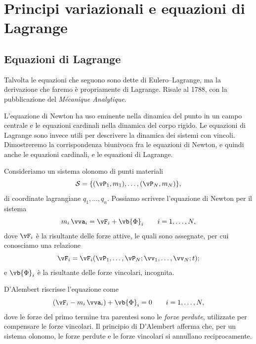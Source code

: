 \section{Principi variazionali e equazioni di Lagrange}
\subsection{Equazioni di Lagrange}
Talvolta le equazioni che seguono sono dette di Eulero--Lagrange, ma la derivazione che faremo è propriamente di Lagrange. Risale al 1788, con la pubblicazione del \emph{Mécanique Analytique}.

 L'equazione di Newton ha uso eminente nella dinamica del punto in un campo centrale e le equazioni cardinali nella dinamica del corpo rigido. Le equazioni di Lagrange sono invece utili per descrivere la dinamica dei sistemi con vincoli. Dimostreremo la corrispondenza biunivoca fra le equazioni di Newton, e quindi anche le equazioni cardinali, e le equazioni di Lagrange.

Consideriamo un sistema olonomo di punti materiali
\begin{equation*}
    \mathcal{S} = \{(\vP_1, m_1), \dots, (\vP_N, m_N)\},
\end{equation*}
di coordinate lagrangiane $q_1, \dots, q_n$.
Possiamo scrivere l'equazione di Newton per il sistema
\begin{equation*}
    m_i\,\vva_i = \vF_i + \vb{\Phi}_i \qquad i = 1, \dots, N,
\end{equation*}
dove $\vF_i$ è la risultante delle forze attive, le quali sono assegnate, per cui conosciamo una relazione
\begin{equation*}
    \vF_i = \vF_i(\vP_1, \dots, \vP_N; \vv_1, \dots, \vv_N; t);
\end{equation*}
e $\vb{\Phi}_i$ è la risultante delle forze vincolari, incognita.

D'Alembert riscrisse l'equazione come
\begin{equation}
    \label{eq:dalambert}
    (\vF_i -m_i\,\vva_i) + \vb{\Phi}_i = 0 \qquad i = 1, \dots, N,
\end{equation}
dove le forze del primo termine tra parentesi sono le \emph{forze perdute}, utilizzate per compensare le forze vincolari. Il principio di D'Alembert afferma che, per un sistema olonomo, le forze perdute e le forze vincolari si annullano reciprocamente.

